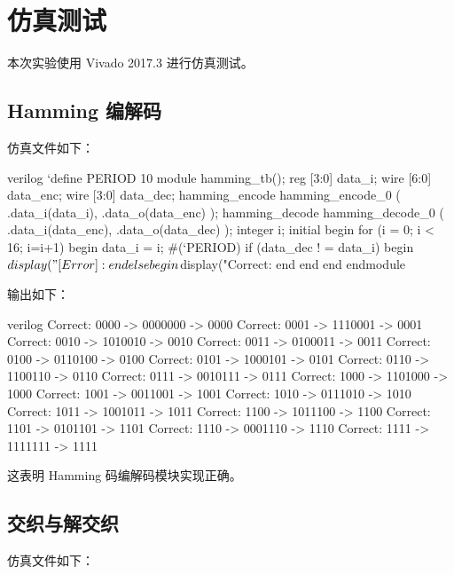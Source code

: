 
\section{仿真测试}

本次实验使用 Vivado 2017.3 进行仿真测试。

\subsection{Hamming 编解码}

仿真文件如下：
\begin{codeblock}{verilog}
`define PERIOD 10
module hamming_tb();
    reg [3:0] data_i;
    wire [6:0] data_enc;
    wire [3:0] data_dec;
    hamming_encode hamming_encode_0 (
        .data_i(data_i),
        .data_o(data_enc)
    );
    hamming_decode hamming_decode_0 (
        .data_i(data_enc),
        .data_o(data_dec)
    );
    integer i;
    initial begin
        for (i = 0; i < 16; i=i+1) begin
            data_i = i;
            #(`PERIOD)
            if (data_dec ! = data_i) begin
                $display("[Error]: %
            end 
            else begin
                $display("Correct: %
            end
        end
    end
endmodule
\end{codeblock}

输出如下：
\begin{codeblock}{verilog}
Correct: 0000 -> 0000000 -> 0000
Correct: 0001 -> 1110001 -> 0001
Correct: 0010 -> 1010010 -> 0010
Correct: 0011 -> 0100011 -> 0011
Correct: 0100 -> 0110100 -> 0100
Correct: 0101 -> 1000101 -> 0101
Correct: 0110 -> 1100110 -> 0110
Correct: 0111 -> 0010111 -> 0111
Correct: 1000 -> 1101000 -> 1000
Correct: 1001 -> 0011001 -> 1001
Correct: 1010 -> 0111010 -> 1010
Correct: 1011 -> 1001011 -> 1011
Correct: 1100 -> 1011100 -> 1100
Correct: 1101 -> 0101101 -> 1101
Correct: 1110 -> 0001110 -> 1110
Correct: 1111 -> 1111111 -> 1111
\end{codeblock}

这表明 Hamming 码编解码模块实现正确。

\subsection{交织与解交织}

仿真文件如下：

